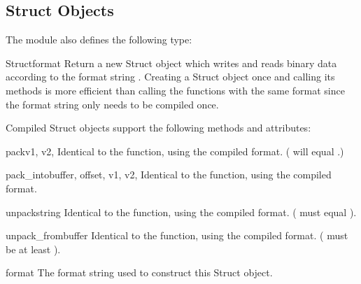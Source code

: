 \begin{seealso}
\end{seealso}

\subsection{Struct Objects \label{struct-objects}}

The  module also defines the following type:

\begin{classdesc}{Struct}{format}
  Return a new Struct object which writes and reads binary data according to
  the format string .  Creating a Struct object once and calling
  its methods is more efficient than calling the  functions
  with the same format since the format string only needs to be compiled once.

\end{classdesc}

Compiled Struct objects support the following methods and attributes:

\begin{methoddesc}[Struct]{pack}{v1, v2, \moreargs}
  Identical to the  function, using the compiled format.
  ( will equal .)
\end{methoddesc}

\begin{methoddesc}[Struct]{pack_into}{buffer, offset, v1, v2, \moreargs}
  Identical to the  function, using the compiled format.
\end{methoddesc}

\begin{methoddesc}[Struct]{unpack}{string}
  Identical to the  function, using the compiled format.
  ( must equal ).
\end{methoddesc}

\begin{methoddesc}[Struct]{unpack_from}{buffer}
  Identical to the  function, using the compiled format.
  ( must be at least ).
\end{methoddesc}

\begin{memberdesc}[Struct]{format}
  The format string used to construct this Struct object.
\end{memberdesc}

